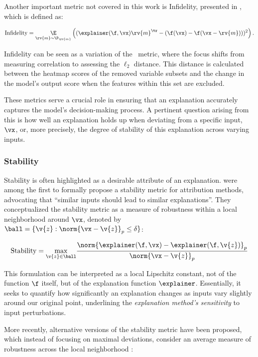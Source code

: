 Another important metric not covered in this work is Infidelity, presented in \cite{yeh2019infidelity}, which is defined as:

$$
\text{Infidelity} = \underset{\rv{m} \sim \P_{\rv{m}}}{\E} \left(( \explainer(\f, \vx) \rv{m}^\tr - (\f(\vx) - \f(\vx - \rv{m})))^2 \right).
$$

Infidelity can be seen as a variation of the \muf~metric, where the focus shifts from measuring correlation to assessing the $\ell_2$ distance. This distance is calculated between the heatmap scores of the removed variable subsets and the change in the model's output score when the features within this set are excluded. 

These metrics serve a crucial role in ensuring that an explanation accurately captures the model's decision-making process. A pertinent question arising from this is how well an explanation holds up when deviating from a specific input, $\vx$, or, more precisely, the degree of stability of this explanation across varying inputs.

\subsubsection{Stability}

Stability is often highlighted as a desirable attribute of an explanation. \cite{alvarezmelis2018robust} were among the first to formally propose a stability metric for attribution methods, advocating that ``similar inputs should lead to similar explanations''. They conceptualized the stability metric as a measure of robustness within a local neighborhood around $\vx$, denoted by $\ball = \{\v{z} : \norm{\vx - \v{z}}_p \leq \delta \}$:

$$
\text{Stability} = \underset{\v{z} \in \ball}{\max} \frac{\norm{\explainer(\f, \vx) -\explainer(\f, \v{z})}_p}{\norm{\vx - \v{z}}_p}
$$

This formulation can be interpreted as a local Lipschitz constant, not of the function $\f$ itself, but of the explanation function $\explainer$. Essentially, it seeks to quantify how significantly an explanation changes as inputs vary slightly around our original point, underlining the \textit{explanation method's sensitivity} to input perturbations. 

More recently, alternative versions of the stability metric have been proposed, which instead of focusing on maximal deviations, consider an average measure of robustness across the local neighborhood \cite{aggregating2020}:

